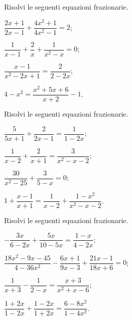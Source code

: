 \begin{esercizio}[\Ast]
\label{ese:20.20}
Risolvi le seguenti equazioni frazionarie.
\begin{multicols}{2}
\begin{enumeratea}
 \item $\dfrac{2x+1}{2x-1}+\dfrac{4x^{2}+1}{4x^{2}-1}=2$;
 \item $\dfrac{1}{x-1}+\dfrac{2}{x}+\dfrac{1}{x^{2}-x}=0$;
 \item $\dfrac{x-1}{x^{2}-2x+1}=\dfrac{2}{2-2x}$;
 \item $4-x^{2}=\dfrac{x^{2}+5x+6}{x+2}-1$.
\end{enumeratea}
\end{multicols}
\end{esercizio}

\begin{esercizio}[\Ast]
\label{ese:20.21}
Risolvi le seguenti equazioni frazionarie.
\begin{multicols}{2}
\begin{enumeratea}
 \item $\dfrac{5}{5x+1}+\dfrac{2}{2x-1}=\dfrac{1}{1-2x}$;
 \item $\dfrac{1}{x-2}+\dfrac{2}{x+1}=\dfrac{3}{x^{2}-x-2}$;
 \item $\dfrac{30}{x^{2}-25}+\dfrac{3}{5-x}=0$;
 \item $1+\dfrac{x-1}{x+1}=\dfrac{1}{x-2}+\dfrac{1-x^{2}}{x^{2}-x-2}$.
\end{enumeratea}
\end{multicols}
\end{esercizio}

\begin{esercizio}[\Ast]
\label{ese:20.22}
Risolvi le seguenti equazioni frazionarie.
\begin{multicols}{2}
\begin{enumeratea}
 \item $-{\dfrac{3x}{6-2x}}+\dfrac{5x}{10-5x}=\dfrac{1-x}{4-2x}$;
 \item $\dfrac{18x^{2}-9x-45}{4-36x^{2}}-\dfrac{6x+1}{9x-3}+\dfrac{21x-1}{18x+6}=0$;
 \item $\dfrac{1}{x+3}-\dfrac{1}{2-x}=\dfrac{x+3}{x^{2}+x-6}$;
 \item $\dfrac{1+2x}{1-2x}+\dfrac{1-2x}{1+2x}=\dfrac{6-8x^{2}}{1-4x^{2}}$.
\end{enumeratea}
\end{multicols}
\end{esercizio}


